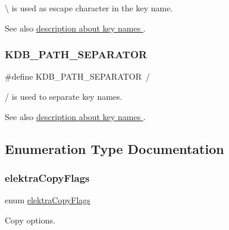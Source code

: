 {\ttfamily \textbackslash{}} is used as escape character in the key name. 

\begin{DoxySeeAlso}{See also}
\hyperlink{group__keyname}{description about key names }. 
\end{DoxySeeAlso}
\mbox{\label{group__key_gad19f92d6d37dc439d1727ca10263c9cc}} 
\subsubsection{\texorpdfstring{K\+D\+B\+\_\+\+P\+A\+T\+H\+\_\+\+S\+E\+P\+A\+R\+A\+T\+OR}{KDB\_PATH\_SEPARATOR}}
{\footnotesize\ttfamily \#define K\+D\+B\+\_\+\+P\+A\+T\+H\+\_\+\+S\+E\+P\+A\+R\+A\+T\+OR~\textquotesingle{}/\textquotesingle{}}



{\ttfamily /} is used to separate key names. 

\begin{DoxySeeAlso}{See also}
\hyperlink{group__keyname}{description about key names }. 
\end{DoxySeeAlso}


\subsection{Enumeration Type Documentation}
\mbox{\label{group__key_ga9ff42b1e9a97222562bfda3dd1f8c735}} 
\subsubsection{\texorpdfstring{elektra\+Copy\+Flags}{elektraCopyFlags}}
{\footnotesize\ttfamily enum \hyperlink{group__key_ga9ff42b1e9a97222562bfda3dd1f8c735}{elektra\+Copy\+Flags}}



Copy options. 

